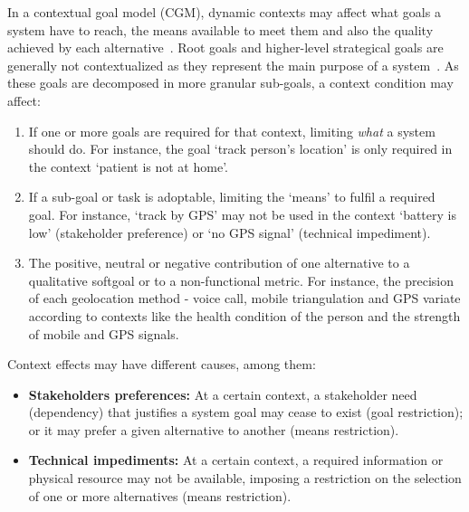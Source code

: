 
In a contextual goal model (CGM), dynamic contexts may affect what goals a system have to reach, the means available to meet them and also the quality achieved by each alternative~\cite{Ali:2010}. Root goals and higher-level strategical goals are generally not contextualized as they represent the main purpose of a system~\cite{Andrea01aframework}. As these goals are decomposed in more granular sub-goals, a context condition may affect:

\begin{enumerate}

\item If one or more goals are required for that context, limiting \textit{what} a system should do. For instance, the goal `track person's location' is only required in the context `patient is not at home'.
\medskip

\item If a sub-goal or task is adoptable, limiting the `means' to fulfil a required goal. For instance, `track by GPS' may not be used in the context `battery is low' (stakeholder preference) or `no GPS signal' (technical impediment).
\medskip

\item The positive, neutral or negative contribution of one alternative to a qualitative softgoal or to a non-functional metric. For instance, the precision of each geolocation method - voice call, mobile triangulation and GPS variate according to contexts like the health condition of the person and the strength of mobile and GPS signals.

\end{enumerate}

Context effects may have different causes, among them:

\begin{itemize}

\item \textbf{Stakeholders preferences:} At a certain context, a stakeholder need (dependency) that justifies a system goal may cease to exist (goal restriction); or it may prefer a given alternative to another (means restriction). %
\medskip

\item \textbf{Technical impediments:} At a certain context, a required information or physical resource may not be available, imposing a restriction on the selection of one or more alternatives (means restriction).

\end{itemize}

